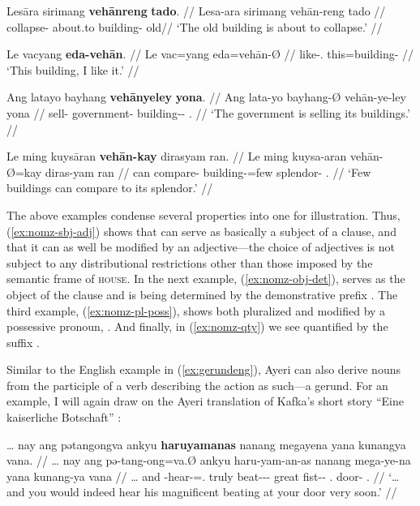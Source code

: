 \pex
\a\label{ex:nomz-sbj-adj}\begingl
	\gla Lesāra sirimang \textbf{vehānreng} \textbf{tado}. //
	\glb Lesa-ara sirimang vehān-reng tado //
	\glc collapse-\TsgI{} about.to building-\AargI{} old//
	\glft `The old building is about to collapse.' //
\endgl

\a\label{ex:nomz-obj-det}\begingl
	\gla Le vacyang \textbf{eda-vehān}. //
	\glb Le vac=yang eda=vehān-Ø //
	\glc \PatTI{} like-\Fsg{}.\Aarg{} this=building-\Top{} //
	\glft `This building, I like it.' //
\endgl

\a\label{ex:nomz-pl-poss}\begingl
	\gla Ang latayo bayhang \textbf{vehānyeley} \textbf{yona}. //
	\glb Ang lata-yo bayhang-Ø vehān-ye-ley yona //
	\glc \AgtT{} sell-\TsgN{} government-\Top{} 
		building-\Pl{}-\PargI{} \TsgN{}.\Gen{} //
	\glft `The government is selling its buildings.' //
\endgl

\a\label{ex:nomz-qty}\begingl
	\gla Le ming kuysāran \textbf{vehān-kay} dirasyam ran. //
	\glb Le ming kuysa-aran vehān-Ø=kay diras-yam ran //
	\glc \PatTI{} can compare-\TplI{} building-\Top=few 
		splendor-\Dat{} \TsgI{}.\Gen{} //
	\glft `Few buildings can compare to its splendor.' //
\endgl
\xe

The above examples condense several properties into one for illustration. Thus,
(\ref{ex:nomz-sbj-adj}) shows that  can serve as basically
a subject of a clause, and that it can as well be modified by an 
adjective---the choice of adjectives is not subject to any distributional
restrictions other than those imposed by the semantic frame of \textsc{house}.
In the next example, (\ref{ex:nomz-obj-det}),  serves as
the object of the clause and is being determined by the demonstrative prefix 
. The third example, (\ref{ex:nomz-pl-poss}), shows 
 both pluralized and modified by a possessive pronoun, 
. And finally, in (\ref{ex:nomz-qty}) we see 
 quantified by the suffix .

Similar to the English example in (\ref{ex:gerundeng}), Ayeri can also derive
nouns from the participle of a verb describing the action as such---a gerund.
For an example, I will again draw on the Ayeri translation of Kafka's short
story \enquote{Eine kaiserliche Botschaft} \citep[2,
14]{becker:kafka:imperial}:

\ex\label{ex:kafkagerund}\begingl
	\gla … nay ang pətangongva ankyu \textbf{haruyamanas} nanang megayena 
		yana kunangya vana. //
	\glb … nay ang pə-tang-ong=va.Ø ankyu haru-yam-an-as nanang 
		mega-ye-na yana kunang-ya vana //
	\glc … and \AgtT{} \NFut{}-hear-\Irr{}=\Ssg{}.\Top{} truly 
		beat-\Ptcp{}-\Nmlz{}-\Parg{} great fist-\Pl{}-\Gen{} 
		\TsgM{}.\Gen{} door-\Loc{} \Ssg{}.\Gen{} //
	\glft `… and you would indeed hear his magnificent beating at your door 
		very soon.' //
\endgl\xe

